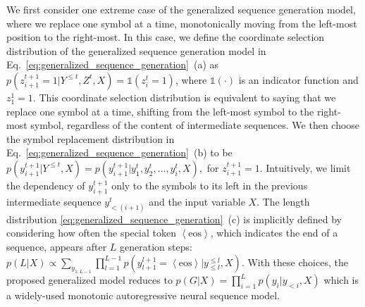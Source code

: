 \documentclass{article}
\begin{document}
We first consider one extreme case of the generalized sequence generation model, where we replace one symbol at a time, monotonically moving from the left-most position to the right-most. 
In this case, we define the coordinate selection distribution of the generalized sequence generation model in Eq.~\eqref{eq:generalized_sequence_generation}~(a) as
\mbox{$
    p(z_{i+1}^{t+1} =1 | Y^{\leq t}, Z^{t}, X)
    = \mathds{1}(z^{t}_{i} = 1)
$},
where $\mathds{1}(\cdot)$ is an indicator function and $z^1_{1}=1$. This coordinate selection distribution is equivalent to saying that we replace one symbol at a time, shifting from the left-most symbol to the right-most symbol, regardless of the content of intermediate sequences.
% 
We then choose the symbol replacement distribution in Eq.~\eqref{eq:generalized_sequence_generation}~(b) to be
\mbox{$
    p(y_{i+1}^{t+1} | Y^{\leq t}, X) = p(y_{i+1}^{t+1} | y_{1}^t, y_{2}^t, \ldots, y_{i}^{t}, X),
$}
for $z_{i+1}^{t+1}=1$. Intuitively, we limit the dependency of $y_{i+1}^{t+1}$ only to the symbols to its left in the previous intermediate sequence $y_{<(i+1)}^t$ and the input variable $X$.
% 
The length distribution \eqref{eq:generalized_sequence_generation}~(c) is implicitly defined by considering how often the special token $\left<\text{eos}\right>$, which indicates the end of a sequence, appears after $L$ generation steps:
\mbox{$
    p(L|X) \propto
    \sum_{y_{1:L-1}}
    \prod_{l=1}^{L-1} p(y_{l+1}^{l+1}=\left< \text{eos} \right>|y_{\leq l}^{\leq l}, X)
$}.
With these choices, the proposed generalized model reduces to
    $p(G|X) = \prod_{i=1}^L p(y_i| y_{<i}, X)$ 
which is a widely-used monotonic autoregressive neural sequence model. 
\end{document}

